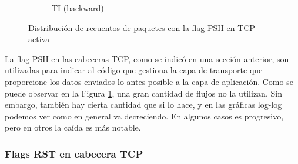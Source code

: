 \begin{figure}[H]
\begin{subfigure}[b]{0.26\textwidth}
        \caption{TI (backward)}
    \end{subfigure}
       \caption{Distribución de recuentos de paquetes con la flag PSH en TCP activa}
       \label{fig:packet_pincer_bidirectional_tcp_psh_flags_count}
\end{figure}

La flag PSH en las cabeceras TCP, como se indicó en una sección anterior, son utilizadas para indicar al código que gestiona la capa de transporte que proporcione los datos enviados lo antes posible a la capa de aplicación. Como se puede observar en la Figura \ref{fig:packet_pincer_bidirectional_tcp_psh_flags_count}, una gran cantidad de flujos no la utilizan. Sin embargo, también hay cierta cantidad que si lo hace, y en las gráficas log-log podemos ver como en general va decreciendo. En algunos casos es progresivo, pero en otros la caída es más notable.

\subsubsection{Flags RST en cabecera TCP}

